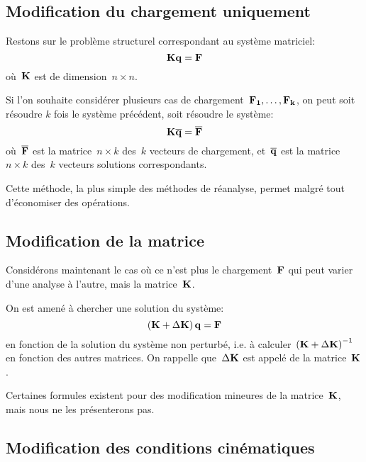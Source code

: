 \medskip
\subsection{Modification du chargement uniquement}

Restons sur le problème structurel correspondant au système matriciel:
\begin{equation}
\MM{K} \VV{q} = \VV{F}
\end{equation}
où~$\MM{K}$ est de dimension~$n\times n$.

\medskip
Si l'on souhaite considérer plusieurs cas de chargement~$\VV{F_1},\ldots,\VV{F_k}$, on peut soit résoudre $k$ fois le système précédent, soit résoudre le système:
\begin{equation}
\MM{K} \MM{\overline{q}} =\MM{\overline{F}}
\end{equation}
où~$\MM{\overline{F}}$ est la matrice~$n\times k$ des~$k$ vecteurs de chargement, et~$\MM{\overline{q}}$ est la
matrice~$n\times k$ des~$k$ vecteurs solutions correspondants.

\medskip
Cette méthode, la plus simple des méthodes de réanalyse, permet malgré tout d'économiser des opérations.


\medskip
\subsection{Modification de la matrice}

Considérons maintenant le cas où ce n'est plus le chargement~$\VV{F}$ qui peut varier d'une analyse à l'autre, mais la matrice~$\MM{K}$.

On est amené à chercher une solution du système:
\begin{equation}
\left(\MM{K}+\Delta\MM{ K}\right)\VV{q}=\VV{F}
\end{equation}
en fonction de la solution du système non perturbé, i.e. à calculer~$\left(\MM{K}+\Delta\MM{K}\right)^{-1}$ en fonction des autres matrices. On rappelle que~$\Delta\MM{ K}$ est appelé   de la matrice~$\MM{K}$.

Certaines formules existent pour des modification mineures de la matrice~$\MM{K}$, mais nous ne les présenterons pas.

\medskip
\subsection{Modification des conditions cinématiques}

